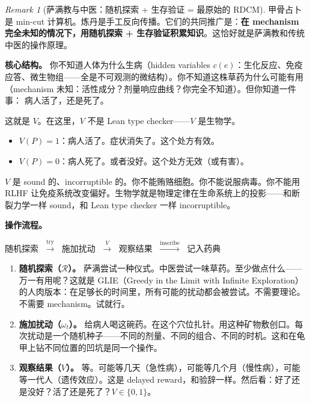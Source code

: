 \documentclass[11pt,a4paper]{article}
\theoremstyle{definition}
\theoremstyle{remark}
\newtheorem{remark}[theorem]{Remark}
\begin{document}
\begin{remark}[萨满教与中医：随机探索 + 生存验证 = 最原始的 RDCM]\label{rem:shaman}
甲骨占卜是 min-cut 计算机。炼丹是手工反向传播。它们的共同推广是：\textbf{在 mechanism 完全未知的情况下，用随机探索 + 生存验证积累知识}。这恰好就是萨满教和传统中医的操作原理。

{\color{red!70!black} \textbf{核心结构。}}
你不知道人体为什么生病（hidden variables $c(e)$：生化反应、免疫应答、微生物组——全是不可观测的微结构）。你不知道这株草药为什么可能有用（mechanism 未知：活性成分？剂量响应曲线？你完全不知道）。但你知道一件事：{\color{green!50!black} 病人活了，还是死了}。

这就是 $V$。在这里，$V$ 不是 Lean type checker——$V$ 是生物学。
\begin{itemize}[nosep]
  \item $V(P) = 1$：病人活了。症状消失了。这个处方有效。
  \item $V(P) = 0$：病人死了。或者没好。这个处方无效（或有害）。
\end{itemize}
$V$ 是 sound 的、incorruptible 的。你不能贿赂细胞。你不能说服病毒。你不能用 RLHF 让免疫系统改变偏好。生物学就是物理定律在生命系统上的投影——和断裂力学一样 sound，和 Lean type checker 一样 incorruptible。

{\color{blue!70!black} \textbf{操作流程。}}

\begin{center}
{\color{red!70!black} 随机探索} $\;\xrightarrow{\text{try}}\;$ {\color{orange!80!black} 施加扰动} $\;\xrightarrow{V}\;$ {\color{green!50!black} 观察结果} $\;\xrightarrow{\text{inscribe}}\;$ {\color{violet!70!black} 记入药典}
\end{center}

\begin{enumerate}[nosep]
  \item {\color{red!70!black} \textbf{随机探索（$\mathcal{R}$）。}} 萨满尝试一种仪式。中医尝试一味草药。至少做点什么——万一有用呢？这就是 GLIE（Greedy in the Limit with Infinite Exploration）的人肉版本：在足够长的时间里，所有可能的扰动都会被尝试。不需要理论。不需要 mechanism。试就行。
  
  \item {\color{orange!80!black} \textbf{施加扰动（$\omega_t$）。}} 给病人喝这碗药。在这个穴位扎针。用这种矿物敷创口。每次扰动是一个随机种子——不同的剂量、不同的组合、不同的时机。这和在龟甲上钻不同位置的凹坑是同一个操作。

  \item {\color{green!50!black} \textbf{观察结果（$V$）。}} 等。可能等几天（急性病），可能等几个月（慢性病），可能等一代人（遗传效应）。这是 delayed reward，和验辞一样。然后看：好了还是没好？活了还是死了？$V \in \{0, 1\}$。


\end{enumerate}
\end{remark}
\end{document}
